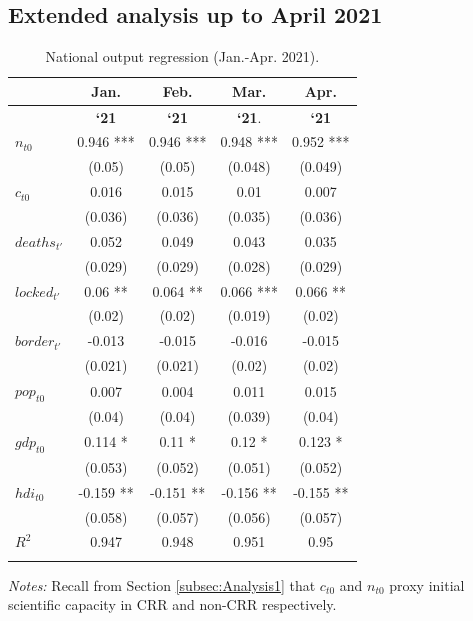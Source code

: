 \subsection{Extended analysis up to April 2021}
\label{sec:ExtAnalysis}



\begin{table}[h!]
	\begin{threeparttable}
\centering
\caption{National output regression (Jan.-Apr. 2021).}
\label{tab:NationalCRRExtended}
\begin{small}
\begin{tabular}{lcccc}
\hline\noalign{\smallskip}
  & {\bf Jan.} & {\bf Feb.} & {\bf Mar.} & {\bf Apr.} \\
  \hline
  & {\bf`21}   & {\bf`21}     & {\bf`21}.    & {\bf`21} \\
  \hline
   $n_{t0}$ & 0.946 ***  & 0.946 ***  & 0.948 ***  & 0.952 ***  \\ 
   & (0.05) & (0.05) & (0.048) & (0.049) \\ 
   $c_{t0}$ & 0.016   & 0.015   & 0.01   & 0.007   \\ 
   & (0.036) & (0.036) & (0.035) & (0.036) \\ 
  $deaths_{t'}$ & 0.052   & 0.049   & 0.043   & 0.035   \\ 
   & (0.029) & (0.029) & (0.028) & (0.029) \\ 
  $locked_{t'}$ & 0.06 **  & 0.064 **  & 0.066 ***  & 0.066 **  \\ 
   & (0.02) & (0.02) & (0.019) & (0.02) \\ 
$border_{t'}$ & -0.013   & -0.015   & -0.016   & -0.015   \\ 
   & (0.021) & (0.021) & (0.02) & (0.02) \\ 
  $pop_{t0}$ & 0.007   & 0.004   & 0.011   & 0.015   \\ 
   & (0.04) & (0.04) & (0.039) & (0.04) \\ 
  $gdp_{t0}$ & 0.114 *  & 0.11 *  & 0.12 *  & 0.123 *  \\ 
   & (0.053) & (0.052) & (0.051) & (0.052) \\ 
  $hdi_{t0}$ & -0.159 **  & -0.151 **  & -0.156 **  & -0.155 **  \\ 
   & (0.058) & (0.057) & (0.056) & (0.057) \\ 
\noalign{\smallskip}\hline\noalign{\smallskip}
$R^2$ & 0.947 & 0.948 & 0.951 & 0.95 \\ 
\noalign{\smallskip}\hline\noalign{\smallskip}

\end{tabular}
  \end{small}
    \begin{tablenotes}
  \footnotesize
  \item {\it Notes:} Recall from Section \ref{subsec:Analysis1} that $c_{t0}$ and $n_{t0}$ proxy initial scientific capacity in CRR and non-CRR respectively. 
    \end{tablenotes}
  \end{threeparttable}
\end{table}


